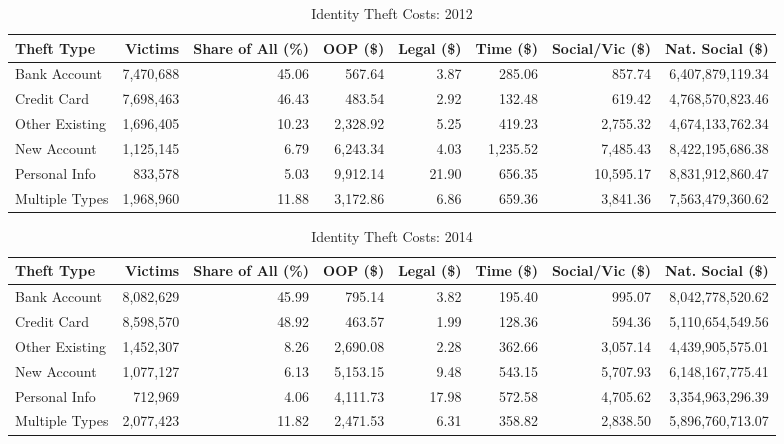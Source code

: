 \documentclass{article}
\begin{document}
\begin{table}[ht]
    \centering
    \caption{Identity Theft Costs: 2012}
    \scriptsize
    \begin{tabularx}{\textwidth}{X r r r r r r r}
        \toprule
        \textbf{Theft Type} & \textbf{Victims} & \textbf{Share of All (\%)} & \textbf{OOP (\$)} & \textbf{Legal (\$)} & \textbf{Time (\$)} & \textbf{Social/Vic (\$)} & \textbf{Nat. Social (\$)} \\ \midrule
        Bank Account & 7,470,688 & 45.06 & 567.64 & 3.87 & 285.06 & 857.74 & 6,407,879,119.34 \\
        Credit Card & 7,698,463 & 46.43 & 483.54 & 2.92 & 132.48 & 619.42 & 4,768,570,823.46 \\
        Other Existing & 1,696,405 & 10.23 & 2,328.92 & 5.25 & 419.23 & 2,755.32 & 4,674,133,762.34 \\
        New Account & 1,125,145 & 6.79 & 6,243.34 & 4.03 & 1,235.52 & 7,485.43 & 8,422,195,686.38 \\
        Personal Info & 833,578 & 5.03 & 9,912.14 & 21.90 & 656.35 & 10,595.17 & 8,831,912,860.47 \\
        Multiple Types & 1,968,960 & 11.88 & 3,172.86 & 6.86 & 659.36 & 3,841.36 & 7,563,479,360.62 \\
        \bottomrule
    \end{tabularx}
\end{table}

\begin{table}[ht]
    \centering
    \caption{Identity Theft Costs: 2014}
    \scriptsize
    \begin{tabularx}{\textwidth}{X r r r r r r r}
        \toprule
        \textbf{Theft Type} & \textbf{Victims} & \textbf{Share of All (\%)} & \textbf{OOP (\$)} & \textbf{Legal (\$)} & \textbf{Time (\$)} & \textbf{Social/Vic (\$)} & \textbf{Nat. Social (\$)} \\ \midrule
        Bank Account & 8,082,629 & 45.99 & 795.14 & 3.82 & 195.40 & 995.07 & 8,042,778,520.62 \\
        Credit Card & 8,598,570 & 48.92 & 463.57 & 1.99 & 128.36 & 594.36 & 5,110,654,549.56 \\
        Other Existing & 1,452,307 & 8.26 & 2,690.08 & 2.28 & 362.66 & 3,057.14 & 4,439,905,575.01 \\
        New Account & 1,077,127 & 6.13 & 5,153.15 & 9.48 & 543.15 & 5,707.93 & 6,148,167,775.41 \\
        Personal Info & 712,969 & 4.06 & 4,111.73 & 17.98 & 572.58 & 4,705.62 & 3,354,963,296.39 \\
        Multiple Types & 2,077,423 & 11.82 & 2,471.53 & 6.31 & 358.82 & 2,838.50 & 5,896,760,713.07 \\
        \bottomrule
    \end{tabularx}
\end{table}
\end{document}
